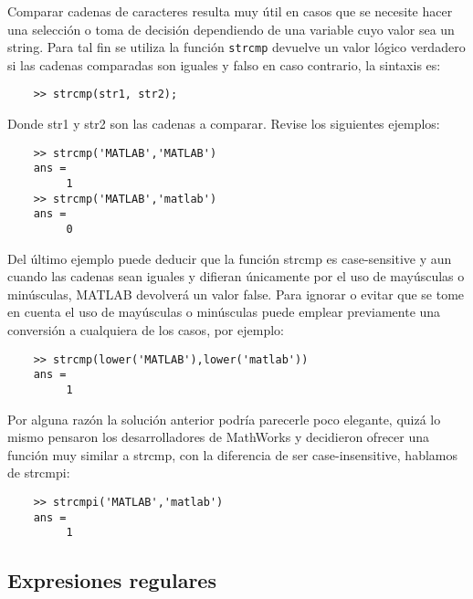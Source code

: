 Comparar cadenas de caracteres resulta muy útil en casos que se necesite hacer una selección o 
toma de decisión dependiendo de una variable cuyo valor sea un string. Para tal fin se utiliza 
la función \texttt{strcmp} devuelve un valor lógico verdadero si las cadenas comparadas son iguales 
y falso en caso contrario, la sintaxis es:

\begin{verbatim}
	>> strcmp(str1, str2);
\end{verbatim}

Donde str1 y str2 son las cadenas a comparar. Revise los siguientes ejemplos:

\begin{verbatim}
	>> strcmp('MATLAB','MATLAB')
	ans =
	     1
	>> strcmp('MATLAB','matlab')
	ans =
	     0
\end{verbatim}

Del último ejemplo puede deducir que la función strcmp es case-sensitive y aun cuando las cadenas 
sean iguales y difieran únicamente por el uso de mayúsculas o minúsculas, MATLAB devolverá un 
valor false. Para ignorar o evitar que se tome en cuenta el uso de mayúsculas o minúsculas puede 
emplear previamente una conversión a cualquiera de los casos, por ejemplo:

\begin{verbatim}
	>> strcmp(lower('MATLAB'),lower('matlab'))
	ans =
	     1
\end{verbatim}

Por alguna razón la solución anterior podría parecerle poco elegante, quizá lo mismo pensaron 
los desarrolladores de MathWorks y decidieron ofrecer una función muy similar a strcmp, con 
la diferencia de ser case-insensitive, hablamos de strcmpi: 

\begin{verbatim}
	>> strcmpi('MATLAB','matlab')
	ans =
	     1
\end{verbatim}

\subsection{Expresiones regulares}